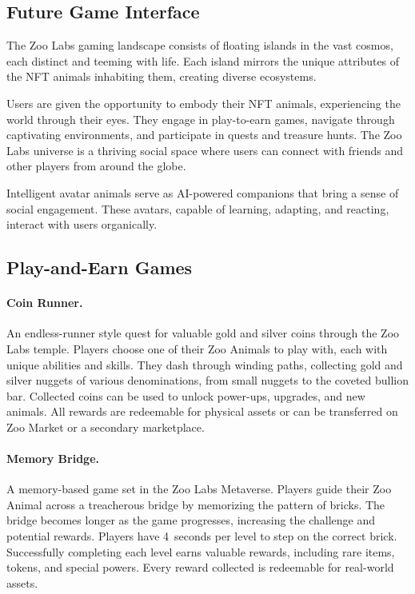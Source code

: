 \subsection{Future Game Interface}

The Zoo Labs gaming landscape consists of floating islands in the vast cosmos, each distinct and teeming with life. Each island mirrors the unique attributes of the NFT animals inhabiting them, creating diverse ecosystems.

Users are given the opportunity to embody their NFT animals, experiencing the world through their eyes. They engage in play-to-earn games, navigate through captivating environments, and participate in quests and treasure hunts. The Zoo Labs universe is a thriving social space where users can connect with friends and other players from around the globe.

Intelligent avatar animals serve as AI-powered companions that bring a sense of social engagement. These avatars, capable of learning, adapting, and reacting, interact with users organically.

\subsection{Play-and-Earn Games}

\paragraph{Coin Runner.}
An endless-runner style quest for valuable gold and silver coins through the Zoo Labs temple. Players choose one of their Zoo Animals to play with, each with unique abilities and skills. They dash through winding paths, collecting gold and silver nuggets of various denominations, from small nuggets to the coveted bullion bar. Collected coins can be used to unlock power-ups, upgrades, and new animals. All rewards are redeemable for physical assets or can be transferred on Zoo Market or a secondary marketplace.

\paragraph{Memory Bridge.}
A memory-based game set in the Zoo Labs Metaverse. Players guide their Zoo Animal across a treacherous bridge by memorizing the pattern of bricks. The bridge becomes longer as the game progresses, increasing the challenge and potential rewards. Players have 4~seconds per level to step on the correct brick. Successfully completing each level earns valuable rewards, including rare items, tokens, and special powers. Every reward collected is redeemable for real-world assets.
